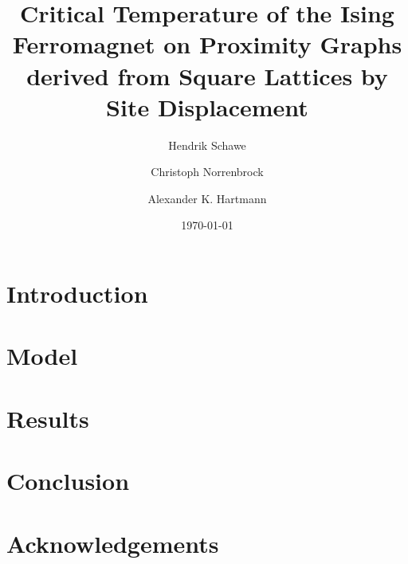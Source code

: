 \documentclass[pre,twocolumn,groupedaddress,showpacs,showkeys,amsmath,amssymb,floatfix]{revtex4-1}
\begin{document}
    \title{Critical Temperature of the Ising Ferromagnet on Proximity Graphs derived from Square Lattices by Site Displacement}
    \author{Hendrik Schawe}
    \author{Christoph Norrenbrock}
    \author{Alexander K. Hartmann}
    \date{\today}

    \begin{abstract}
    
    \end{abstract}

    \maketitle

    \section{Introduction}
        

    \section{Model}
        

    \section{Results}
        

    \section{Conclusion}
        

    \section{Acknowledgements}
        

    
\end{document}
